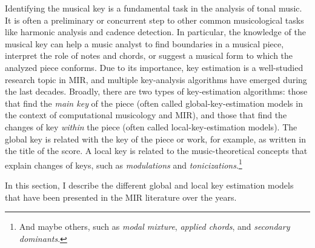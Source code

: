 

Identifying the musical key is a fundamental task in the
analysis of tonal music. It is often a preliminary or
concurrent step to other common musicological tasks like
harmonic analysis and cadence detection. In particular, the
knowledge of the musical key can help a music analyst to
find boundaries in a musical piece, interpret the role of
notes and chords, or suggest a musical form to which the
analyzed piece conforms. Due to its importance, key
estimation is a well-studied research topic in MIR, and
multiple key-analysis algorithms have emerged during the
last decades. Broadly, there are two types of key-estimation
algorithms: those that find the \emph{main key} of the piece
(often called global-key-estimation models in the context of
computational musicology and MIR), and those that find the
changes of key \emph{within} the piece (often called
local-key-estimation models). The global key is related with
the key of the piece or work, for example, as written in the
title of the score.
A local key is related to the music-theoretical concepts
that explain changes of keys, such as \emph{modulations} and
\emph{tonicizations}.\footnote{And maybe others, such as
\emph{modal mixture}, \emph{applied chords}, and
\emph{secondary dominants}.}

In this section, I describe the different global and local
key estimation models that have been presented in the MIR
literature over the years.
